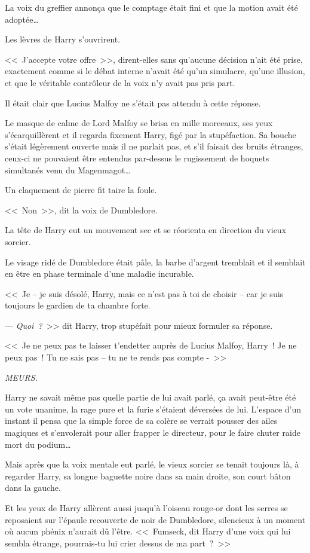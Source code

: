 La voix du greffier annonça que le comptage était fini et que la motion avait été adoptée…

Les lèvres de Harry s'ouvrirent.

<<~J'accepte votre offre~>>, dirent-elles sans qu'aucune décision n'ait été prise, exactement comme si le débat interne n'avait été qu'un simulacre, qu'une illusion, et que le véritable contrôleur de la voix n'y avait pas pris part.

Il était clair que Lucius Malfoy ne s'était pas attendu à cette réponse.

Le masque de calme de Lord Malfoy se brisa en mille morceaux, ses yeux s'écarquillèrent et il regarda fixement Harry, figé par la stupéfaction. Sa bouche s'était légèrement ouverte mais il ne parlait pas, et s'il faisait des bruits étranges, ceux-ci ne pouvaient être entendus par-dessus le rugissement de hoquets simultanés venu du Magenmagot…

Un claquement de pierre fit taire la foule.

<<~Non~>>, dit la voix de Dumbledore.

La tête de Harry eut un mouvement sec et se réorienta en direction du vieux sorcier.

Le visage ridé de Dumbledore était pâle, la barbe d'argent tremblait et il semblait en être en phase terminale d'une maladie incurable.

<<~Je -- je suis désolé, Harry, mais ce n'est pas à toi de choisir -- car je suis toujours le gardien de ta chambre forte.

--- \emph{Quoi~?}~>> dit Harry, trop stupéfait pour mieux formuler sa réponse.

<<~Je ne peux pas te laisser t'endetter auprès de Lucius Malfoy, Harry~! Je ne peux pas~! Tu ne sais pas -- tu ne te rends pas compte -~>>

\emph{MEURS.}

Harry ne savait même pas quelle partie de lui avait parlé, ça avait peut-être été un vote unanime, la rage pure et la furie s'étaient déversées de lui. L'espace d'un instant il pensa que la simple force de sa colère se verrait pousser des ailes magiques et s'envolerait pour aller frapper le directeur, pour le faire chuter raide mort du podium…

Mais après que la voix mentale eut parlé, le vieux sorcier se tenait toujours là, à regarder Harry, sa longue baguette noire dans sa main droite, son court bâton dans la gauche.

Et les yeux de Harry allèrent aussi jusqu'à l'oiseau rouge-or dont les serres se reposaient sur l'épaule recouverte de noir de Dumbledore, silencieux à un moment où aucun phénix n'aurait dû l'être. <<~Fumseck, dit Harry d'une voix qui lui sembla étrange, pourrais-tu lui crier dessus de ma part~?~>>

